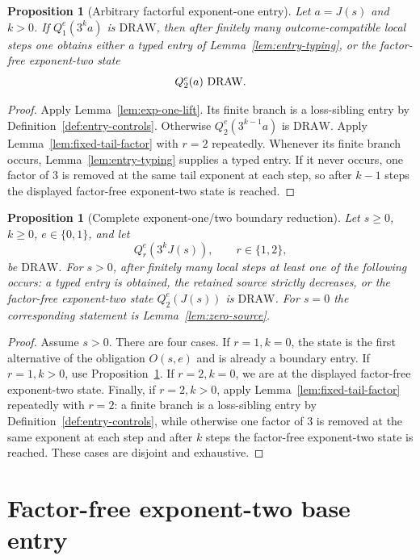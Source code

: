 \documentclass[11pt]{article}
\newtheorem{proposition}[theorem]{Proposition}
\newcommand{\DRAW}{\ensuremath{\mathrm{DRAW}}}
\begin{document}
\begin{proposition}[Arbitrary factorful exponent-one entry]\label{prop:factorful-entry}
Let $a=J(s)$ and $k>0$. If $Q_1^e(3^ka)$ is \DRAW, then after finitely many
outcome-compatible local steps one obtains either a typed entry of
Lemma~\ref{lem:entry-typing}, or the factor-free exponent-two state
\[
  Q_2^e(a)\text{ \DRAW}.
\]
\end{proposition}

\begin{proof}
Apply Lemma~\ref{lem:exp-one-lift}. Its finite branch is a loss-sibling entry by Definition~\ref{def:entry-controls}. Otherwise $Q_2^e(3^{k-1}a)$ is \DRAW. Apply
Lemma~\ref{lem:fixed-tail-factor} with $r=2$ repeatedly. Whenever its finite
branch occurs, Lemma~\ref{lem:entry-typing} supplies a typed entry. If it never
occurs, one factor of $3$ is removed at the same tail exponent at each step,
so after $k-1$ steps the displayed factor-free exponent-two state is reached.
\end{proof}

\begin{proposition}[Complete exponent-one/two boundary reduction]\label{prop:boundary-reduction}
Let $s\ge0$, $k\ge0$, $e\in\{0,1\}$, and let
\[
  Q_r^e(3^kJ(s)),\qquad r\in\{1,2\},
\]
be \DRAW. For $s>0$, after finitely many local steps at least one of the following occurs: a typed entry is obtained, the retained source strictly
decreases, or the factor-free exponent-two state $Q_2^e(J(s))$ is \DRAW.
For $s=0$ the corresponding statement is Lemma~\ref{lem:zero-source}.
\end{proposition}

\begin{proof}
Assume $s>0$. There are four cases. If $r=1,k=0$, the state is the first
alternative of the obligation $O(s,e)$ and is already a boundary entry. If
$r=1,k>0$, use Proposition~\ref{prop:factorful-entry}. If $r=2,k=0$, we are
at the displayed factor-free exponent-two state. Finally, if $r=2,k>0$, apply
Lemma~\ref{lem:fixed-tail-factor} repeatedly with $r=2$: a finite branch is a
loss-sibling entry by Definition~\ref{def:entry-controls}, while otherwise
one factor of $3$ is removed at the same exponent at each step and after $k$
steps the factor-free exponent-two state is reached. These cases are disjoint
and exhaustive.
\end{proof}

\section{Factor-free exponent-two base entry}
\end{document}
